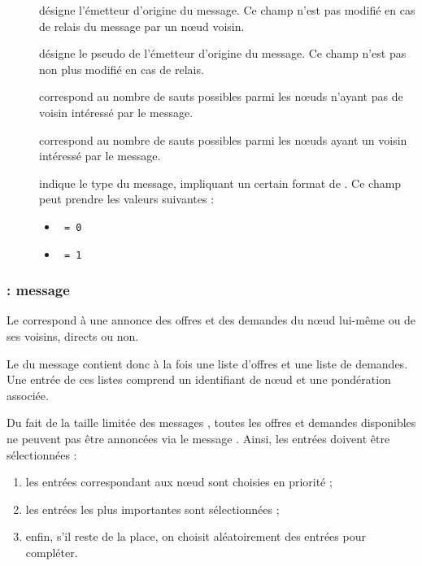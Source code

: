 \begin{description}
	\item[\fkfrom] désigne l'émetteur d'origine du message. Ce champ n'est pas modifié en cas de relais du message par un n\oe ud voisin.
	\item[\fknick] désigne le pseudo de l'émetteur d'origine du message. Ce champ n'est pas non plus modifié en cas de relais.
	\item[\fkttl] correspond au nombre de sauts possibles parmi les n\oe uds n'ayant pas de voisin intéressé par le message.
	\item[\fktts] correspond au nombre de sauts possibles parmi les n\oe uds ayant un voisin intéressé par le message.
	\item[\fktype] indique le type du message, impliquant un certain format de \payload. Ce champ peut prendre les valeurs suivantes :
		\begin{itemize}
			\item \texttt{\msgheartbeat{} = 0}
			\item \texttt{\msgpie{} = 1}
		\end{itemize}
\end{description}

\format{\ffrom \apgdelim \fnick \apgdelim \fttl \apgdelim \ftts \apgdelim \\ \ftype \apgdelim \fvpayload}


\subsubsection{\Payload : message \msgheartbeat}

Le \heartbeat{} correspond à une annonce des offres et des demandes du n\oe ud lui-même ou de ses voisins, directs ou non.

Le \payload{} du message contient donc à la fois une liste d'offres et une liste de demandes.
Une entrée de ces listes comprend un identifiant de n\oe ud et une pondération associée.

Du fait de la taille limitée des messages \airplug, toutes les offres et demandes disponibles ne peuvent pas être annoncées via le message \msgheartbeat.
Ainsi, les entrées doivent être sélectionnées :

\begin{enumerate}
	\item les entrées correspondant aux n\oe ud sont choisies en priorité ;
	\item les entrées les plus importantes sont sélectionnées ;
	\item enfin, s'il reste de la place, on choisit aléatoirement des entrées pour compléter.
\end{enumerate}

